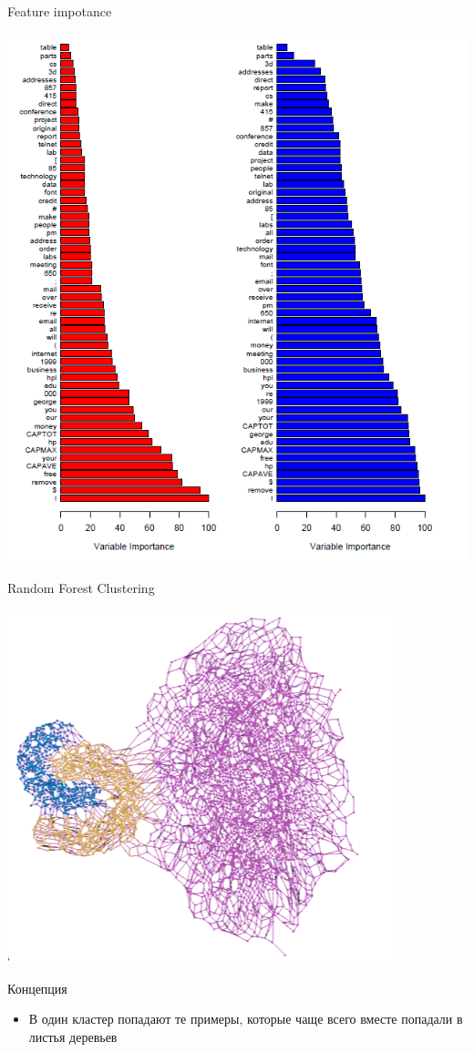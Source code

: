 \documentclass[10pt]{beamer}
\begin{document}
\begin{frame}{Feature impotance}
\begin{center}
    \includegraphics[scale=0.3]{images/impotance.png}
\end{center}
\end{frame}

\begin{frame}{Random Forest Clustering}
\begin{center}
    \includegraphics[scale=0.9]{images/RFCgraph.png}
\end{center}
\begin{block}{Концепция}
\end{block}
\begin{itemize}
    \item В один кластер попадают те примеры, которые чаще всего вместе попадали в
    листья деревьев
\end{itemize}
\end{frame}
\end{document}
